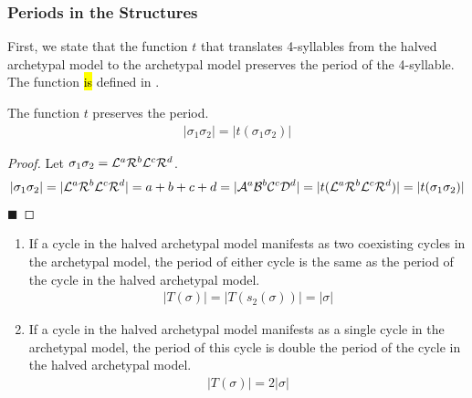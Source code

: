 \subsubsection{Periods in the  Structures}

First, we state that the function $t$ that translates 4-syllables from the halved archetypal model to the archetypal model preserves the period of the 4-syllable.
The function \hl{is} defined in .

\begin{lemma}
	\label{lemma:t.preserves.period}
	The function $t$ preserves the period.
	\begin{align}
		|\sigma_1\sigma_2| = |t(\sigma_1\sigma_2)|
	\end{align}
\end{lemma}

\begin{proof}
	Let $\sigma_1\sigma_2 = \mathcal{L}^a\mathcal{R}^b\mathcal{L}^c\mathcal{R}^d$.
	\begin{align*}
		|\sigma_1\sigma_2| =  |\mathcal{L}^a\mathcal{R}^b\mathcal{L}^c\mathcal{R}^d|
		= a + b + c + d
		= |\mathcal{A}^a\mathcal{B}^b\mathcal{C}^c\mathcal{D}^d|
		= |t(\mathcal{L}^a\mathcal{R}^b\mathcal{L}^c\mathcal{R}^d)|
		= |t(\sigma_1\sigma_2)|
	\end{align*}
	\hfill $\blacksquare$
\end{proof}

\begin{theorem}
	\label{theorem:period.pal}
	\begin{enumerate}
		\item If a cycle in the halved archetypal model manifests as two coexisting cycles in the archetypal model, the period of either cycle is the same as the period of the cycle in the halved archetypal model.
		      \begin{align}
			      |T(\sigma)| = |T(s_2(\sigma))| = |\sigma|
		      \end{align}
		\item If a cycle in the halved archetypal model manifests as a single cycle in the archetypal model, the period of this cycle is double the period of the cycle in the halved archetypal model.
		      \begin{align}
			      |T(\sigma)| = 2 |\sigma|
		      \end{align}
	\end{enumerate}
\end{theorem}

